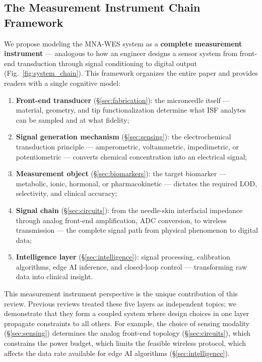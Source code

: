 \documentclass[review,1p]{elsarticle}
\begin{document}
\subsection{The Measurement Instrument Chain Framework}
\label{subsec:framework}

We propose modeling the MNA-WES system as a \textbf{complete measurement instrument} — analogous to how an engineer designs a sensor system from front-end transduction through signal conditioning to digital output (Fig.~\ref{fig:system_chain}). This framework organizes the entire paper and provides readers with a single cognitive model:

\begin{enumerate}
    \item \textbf{Front-end transducer} (§\ref{sec:fabrication}): the microneedle itself — material, geometry, and tip functionalization determine what ISF analytes can be sampled and at what fidelity;
    \item \textbf{Signal generation mechanism} (§\ref{sec:sensing}): the electrochemical transduction principle — amperometric, voltammetric, impedimetric, or potentiometric — converts chemical concentration into an electrical signal;
    \item \textbf{Measurement object} (§\ref{sec:biomarkers}): the target biomarker — metabolic, ionic, hormonal, or pharmacokinetic — dictates the required LOD, selectivity, and clinical accuracy;
    \item \textbf{Signal chain} (§\ref{sec:circuits}): from the needle-skin interfacial impedance through analog front-end amplification, ADC conversion, to wireless transmission — the complete signal path from physical phenomenon to digital data;
    \item \textbf{Intelligence layer} (§\ref{sec:intelligence}): signal processing, calibration algorithms, edge AI inference, and closed-loop control — transforming raw data into clinical insight.
\end{enumerate}

This measurement instrument perspective is the unique contribution of this review. Previous reviews treated these five layers as independent topics; we demonstrate that they form a coupled system where design choices in one layer propagate constraints to all others. For example, the choice of sensing modality (§\ref{sec:sensing}) determines the analog front-end topology (§\ref{sec:circuits}), which constrains the power budget, which limits the feasible wireless protocol, which affects the data rate available for edge AI algorithms (§\ref{sec:intelligence}).
\end{document}
